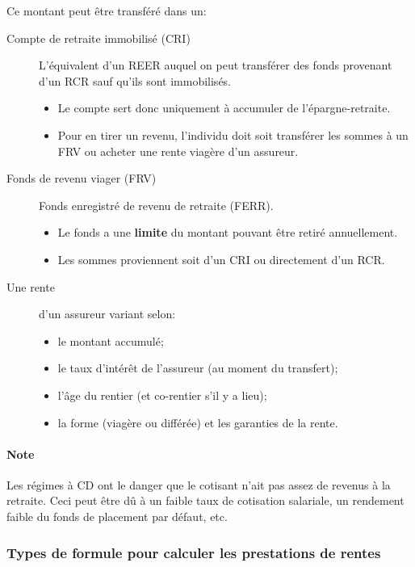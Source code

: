 \documentclass[10pt, french]{article}
\begin{document}
\begin{multicols*}{3}
\begin{definitionNOHFILLsub}
Ce montant peut être transféré dans un:
\begin{description}
	\item[Compte de retraite immobilisé (CRI)]	L'équivalent d'un REER auquel on peut transférer des fonds provenant d'un RCR sauf qu'ils sont immobilisés.
		\begin{itemize}[leftmargin = *]
		\item	Le compte sert donc uniquement à accumuler de l'épargne-retraite.
		\item	Pour en tirer un revenu, l'individu doit soit transférer les sommes à un FRV ou acheter une rente viagère d'un assureur.
		\end{itemize}
	\item[Fonds de revenu viager (FRV)]	Fonds enregistré de revenu de retraite (FERR).
		\begin{itemize}[leftmargin = *]
		\item	Le fonds a une \textbf{limite} du montant pouvant être retiré annuellement.
		\item	Les sommes proviennent soit d'un CRI ou directement d'un RCR.
		\end{itemize}
	\item[Une rente]d'un assureur variant selon:
		\begin{itemize}[leftmargin = *]
		\item	le montant accumulé;
		\item	le taux d'intérêt de l'assureur (au moment du transfert);
		\item	l'âge du rentier (et co-rentier s'il y a lieu);
		\item	la forme (viagère ou différée) et les garanties de la rente.
		\end{itemize}
\end{description}
\end{definitionNOHFILLsub}

\paragraph{Note}	Les régimes à CD ont le danger que le cotisant n'ait pas assez de revenus à la retraite. Ceci peut être dû à un faible taux de cotisation salariale, un rendement faible du fonds de placement par défaut, etc.

\subsubsection*{Types de formule pour calculer les prestations de rentes}


\end{multicols*}
\end{document}

